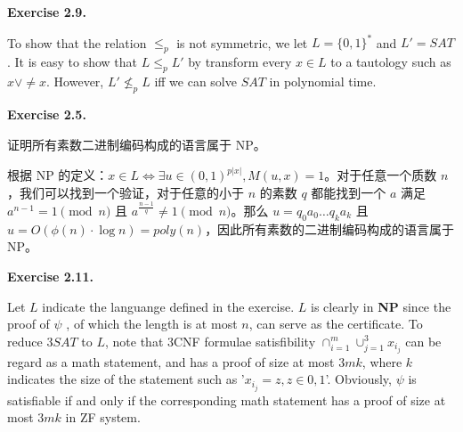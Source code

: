 \documentclass[a4paper]{article}
\newenvironment{exercise}[1]{
	\par
	\noindent\textbf{Exercise #1.}\quad
}{
	\par
	\bigskip
}
\begin{document}
	\begin{exercise}{2.9}
		To show that the relation $\leq_p$ is not symmetric, we let $L=\{0,1\}^*$ and $L'=SAT$. It is easy to show that $L\leq_p L'$ by transform every $x\in L$ to a tautology such as $x\vee \neq x$. However, $L'\not\leq_p L$ iff we can solve $SAT$ in polynomial time.
	\end{exercise}
	
	\begin{exercise}{2.5}
		证明所有素数二进制编码构成的语言属于 NP。​

		根据 NP 的定义：$x\in L \iff\exists u\in (0,1)^{p|x|},M(u,x)=1$。对于任意一个质数 $n$，我们可以找到一个验证，对于任意的小于 $n$ 的素数 $q$ 都能找到一个 $a$ 满足 $a^{n-1}=1 \pmod n$ 且 $a^{\frac{n-1}{q}}\ne 1 \pmod n$。那么 $u=q_0a_0\dots q_ka_k$ 且 $u=O(\phi (n)\cdot\log n)=poly (n)$，因此所有素数的二进制编码构成的语言属于 NP。
	\end{exercise}

	\begin{exercise}{2.11}
		Let $L$ indicate the languange defined in the exercise. $L$ is  clearly in \textbf{NP} since the proof of $\psi$ , of which the length is at most $n$, can serve as the certificate. To reduce $3 SAT$ to $L$, note that 3CNF formulae satisfibility $\cap_{i=1}^m \cup_{j=1}^3 x_{i_j}$ can be regard as a math statement, and has a proof of size at most $3mk$, where $k$ indicates the size of the statement such as '$x_{i_j}=z,z\in{0,1}$'. Obviously, $\psi$ is satisfiable if and only if the corresponding math statement has a proof of size at most $3mk$ in ZF system.
	\end{exercise}
\end{document}
